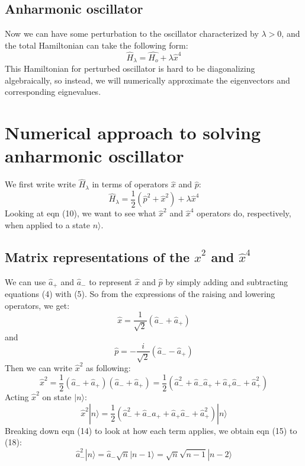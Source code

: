 \documentclass[]{article}
\begin{document}
\subsection{Anharmonic oscillator}
Now we can have some perturbation to the oscillator characterized by $\lambda >0$, and the total Hamiltonian can take the following form:
\begin{equation}
	\hat{H}_{\lambda}= \hat{H_o}+\lambda\hat{x}^4
\end{equation}  
This Hamiltonian for perturbed oscillator is hard to be diagonalizing algebraically, so instead, we will numerically approximate the eigenvectors and corresponding eignevalues.
\section{Numerical approach to solving anharmonic oscillator}
We first write write $\hat{H}_{\lambda}$ in terms of operators $\hat{x}$ and $\hat{p}$:
\begin{equation}
	\hat{H}_{\lambda}= \frac{1}{2}(\hat{p}^2+\hat{x}^2)+\lambda\hat{x}^4
\end{equation}
Looking at eqn (10), we want to see what $\hat{x}^2$ and $\hat{x}^4$ operators do, respectively, when applied to a state $n \rangle$.
\subsection{Matrix representations of the $\hat{x}^2$ and $\hat{x}^4$}

We can use  $\hat{a}_+$ and $\hat{a}_-$ to represent $\hat{x}$ and $\hat{p}$ by simply adding and subtracting equations (4) with (5). So from the expressions of the raising and lowering operators, we get:
\begin{equation}
	\hat{x}=\frac{1}{\sqrt{2}}(\hat{a}_- +\hat{a}_+)
\end{equation}
and 
\begin{equation}
\hat{p}=-\frac{i}{\sqrt{2}}(\hat{a}_- -\hat{a}_+)
\end{equation}
Then we can write $\hat{x}^2$ as following:
\begin{equation}
	\hat{x}^2=\frac{1}{2}(\hat{a}_- + \hat{a}_+)(\hat{a}_- + \hat{a}_+)	
	= \frac{1}{2}(\hat{a}_-^2 + \hat{a}_-\hat{a}_+ + \hat{a}_+\hat{a}_-  + \hat{a}_+ ^2)
\end{equation}
Acting $\hat{x}^2$ on state $| n \rangle$: 
\begin{equation}
\hat{x}^2|n\rangle 
	= \frac{1}{2}(\hat{a}_-^2 +  \hat{a}_-\hat{a}_+   + \hat{a}_+\hat{a}_-  + \hat{a}_+^2)|n\rangle 
\end{equation}
Breaking down eqn (14) to look at how each term applies, we obtain eqn (15) to (18):
\begin{equation}
	\hat{a}_-^2|n\rangle 
	= \hat{a}_{-}{\sqrt{n}|n-1\rangle}
	= \sqrt{n}\sqrt{n-1}|n-2\rangle 
\end{equation}
\end{document}
